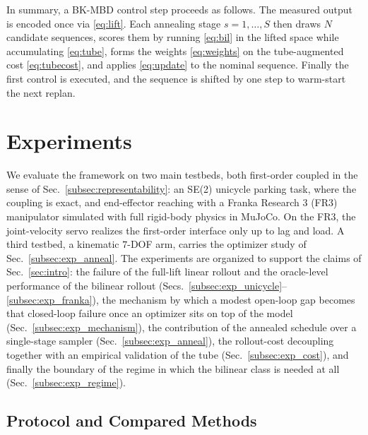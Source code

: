 \documentclass[lettersize,journal]{IEEEtran}
\theoremstyle{remark}
\newcommand{\bkmbd}{\textsc{BK-MBD}}
\begin{document}
In summary, a \bkmbd{} control step proceeds as follows. The measured
output is encoded once via \eqref{eq:lift}. Each annealing stage
$s = 1, \dots, S$ then draws $N$ candidate sequences, scores them by
running \eqref{eq:bil} in the lifted space while accumulating
\eqref{eq:tube}, forms the weights \eqref{eq:weights} on the
tube-augmented cost \eqref{eq:tubecost}, and applies \eqref{eq:update}
to the nominal sequence. Finally the first control is executed, and the
sequence is shifted by one step to warm-start the next replan.

\section{Experiments}\label{sec:exp}
We evaluate the framework on two main testbeds, both first-order
coupled in the sense of Sec.~\ref{subsec:representability}: an SE(2)
unicycle parking task, where the coupling is exact, and end-effector
reaching with a Franka Research 3 (FR3) manipulator simulated with full
rigid-body physics in MuJoCo. On the FR3, the joint-velocity servo
realizes the first-order interface only up to lag and load.
A third testbed, a kinematic $7$-DOF arm, carries the optimizer study of
Sec.~\ref{subsec:exp_anneal}. The
experiments are organized to support the claims of Sec.~\ref{sec:intro}:
the failure of the full-lift linear rollout and the oracle-level
performance of the bilinear rollout
(Secs.~\ref{subsec:exp_unicycle}--\ref{subsec:exp_franka}), the mechanism
by which a modest open-loop gap becomes that closed-loop failure once an
optimizer sits on top of the model (Sec.~\ref{subsec:exp_mechanism}),
the contribution of the annealed schedule over a single-stage sampler
(Sec.~\ref{subsec:exp_anneal}), the
rollout-cost decoupling together with an empirical validation of the tube
(Sec.~\ref{subsec:exp_cost}), and finally the boundary of the regime in
which the bilinear class is needed at all
(Sec.~\ref{subsec:exp_regime}).

\subsection{Protocol and Compared Methods}\label{subsec:setup}
\end{document}
